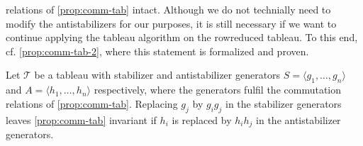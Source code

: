 relations of \cref{prop:comm-tab} intact. Although we do not technially need to
modify the antistabilizers for our purposes, it is still necessary if we want
to continue applying the tableau algorithm on the rowreduced tableau. To this
end, cf. \cref{prop:comm-tab-2}, where this statement is formalized and proven.
\begin{prop}\label{prop:comm-tab-2}
  Let $\mathcal{T}$ be a tableau with stabilizer and antistabilizer generators
  $S=\langle g_1, \ldots, g_n \rangle$ and $A=\langle h_1, \ldots, h_n \rangle$
  respectively, where the generators fulfil the commutation relations of
  \cref{prop:comm-tab}. 
  Replacing $g_j$ by $g_i g_j$ in the stabilizer generators leaves
  \cref{prop:comm-tab} invariant if $h_i$ is replaced by $h_i h_j$ in the antistabilizer
  generators.
\end{prop}
